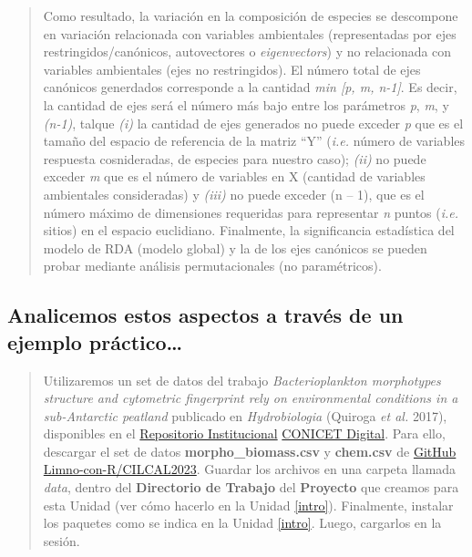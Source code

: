 \documentclass[
]{book}
\begin{document}
\begin{quote}
Como resultado, la variación en la composición de especies se descompone en variación relacionada con variables ambientales (representadas por ejes restringidos/canónicos, autovectores o \emph{eigenvectors}) y no relacionada con variables ambientales (ejes no restringidos). El número total de ejes canónicos generdados corresponde a la cantidad \emph{min {[}p, m, n-1{]}}. Es decir, la cantidad de ejes será el número más bajo entre los parámetros \emph{p}, \emph{m}, y \emph{(n-1)}, talque \emph{(i)} la cantidad de ejes generados no puede exceder \emph{p} que es el tamaño del espacio de referencia de la matriz ``Y'' (\emph{i.e.} número de variables respuesta cosnideradas, de especies para nuestro caso); \emph{(ii)} no puede exceder \emph{m} que es el número de variables en X (cantidad de variables ambientales consideradas) y \emph{(iii)} no puede exceder (n -- 1), que es el número máximo de dimensiones requeridas para representar \emph{n} puntos (\emph{i.e.} sitios) en el espacio euclidiano. Finalmente, la significancia estadística del modelo de RDA (modelo global) y la de los ejes canónicos se pueden probar mediante análisis permutacionales (no paramétricos).
\end{quote}

\hypertarget{analicemos-estos-aspectos-a-travuxe9s-de-un-ejemplo-pruxe1ctico}{%
\subsection{Analicemos estos aspectos a través de un ejemplo práctico\ldots{}}\label{analicemos-estos-aspectos-a-travuxe9s-de-un-ejemplo-pruxe1ctico}}

\begin{quote}
Utilizaremos un set de datos del trabajo \emph{Bacterioplankton morphotypes structure and cytometric fingerprint rely on environmental conditions in a sub-Antarctic peatland} publicado en \emph{Hydrobiologia} (Quiroga \emph{et al.} 2017), disponibles en el \href{http://hdl.handle.net/11336/201811}{Repositorio Institucional} \href{http://hdl.handle.net/11336/201874}{CONICET Digital}. Para ello, descargar el set de datos \textbf{morpho\_biomass.csv} y \textbf{chem.csv} de \href{https://github.com/Limno-con-R/CILCAL2023/tree/main/datasets}{GitHub Limno-con-R/CILCAL2023}.
Guardar los archivos en una carpeta llamada \emph{data}, dentro del \textbf{Directorio de Trabajo} del \textbf{Proyecto} que creamos para esta Unidad (ver cómo hacerlo en la Unidad \ref{intro}). Finalmente, instalar los paquetes como se indica en la Unidad \ref{intro}. Luego, cargarlos en la sesión.
\end{quote}
\end{document}
